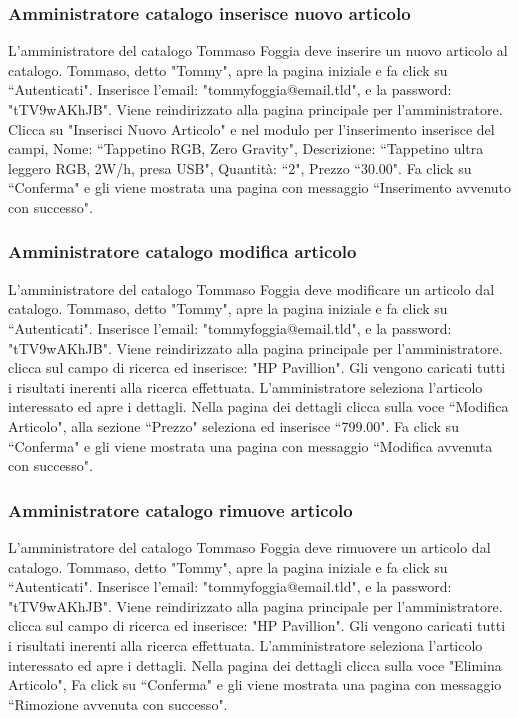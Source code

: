 \documentclass[12pt]{article}
\begin{document}
\subsubsection{Amministratore catalogo inserisce nuovo articolo}
L'amministratore del catalogo Tommaso Foggia deve inserire un nuovo articolo al catalogo.
Tommaso, detto "Tommy", apre la pagina iniziale e fa click su ``Autenticati".
Inserisce l'email: "tommyfoggia@email.tld", e la password: "tTV9wAKhJB".
Viene reindirizzato alla pagina principale per l'amministratore.
Clicca su "Inserisci Nuovo Articolo" e nel modulo per l'inserimento inserisce del campi, Nome: ``Tappetino RGB, Zero Gravity", Descrizione: ``Tappetino ultra leggero RGB, 2W/h, presa USB",
Quantità: ``2", Prezzo ``30.00".
Fa click su ``Conferma" e gli viene mostrata una pagina con messaggio ``Inserimento avvenuto con successo".

\newpage

\subsubsection{Amministratore catalogo modifica articolo}
L'amministratore del catalogo Tommaso Foggia deve modificare un articolo dal catalogo.
Tommaso, detto "Tommy", apre la pagina iniziale e fa click su ``Autenticati".
Inserisce l'email: "tommyfoggia@email.tld", e la password: "tTV9wAKhJB".
Viene reindirizzato alla pagina principale per l'amministratore.
clicca sul campo di ricerca ed inserisce: "HP Pavillion".
Gli vengono caricati tutti i risultati inerenti alla ricerca effettuata.
L'amministratore seleziona l'articolo interessato ed apre i dettagli.
Nella pagina dei dettagli clicca sulla voce ``Modifica Articolo",
alla sezione ``Prezzo" seleziona ed inserisce ``799.00".
Fa click su ``Conferma" e gli viene mostrata una pagina con messaggio ``Modifica avvenuta con successo".

\subsubsection{Amministratore catalogo rimuove articolo}
L'amministratore del catalogo Tommaso Foggia deve rimuovere un articolo dal catalogo.
Tommaso, detto "Tommy", apre la pagina iniziale e fa click su ``Autenticati".
Inserisce l'email: "tommyfoggia@email.tld", e la password: "tTV9wAKhJB".
Viene reindirizzato alla pagina principale per l'amministratore.
clicca sul campo di ricerca ed inserisce: "HP Pavillion".
Gli vengono caricati tutti i risultati inerenti alla ricerca effettuata.
L'amministratore seleziona l'articolo interessato ed apre i dettagli.
Nella pagina dei dettagli clicca sulla voce "Elimina Articolo",
Fa click su ``Conferma" e gli viene mostrata una pagina con messaggio ``Rimozione avvenuta con successo".
\end{document}
